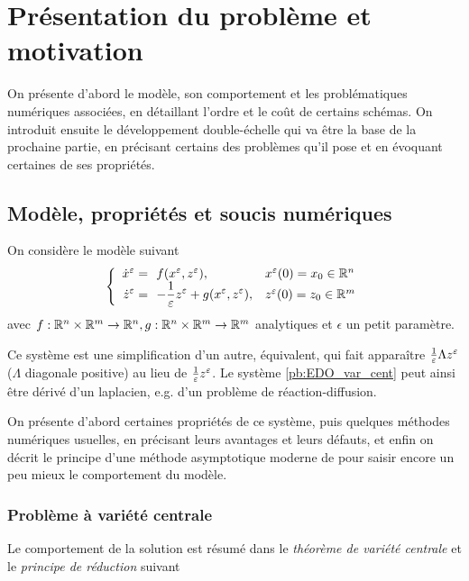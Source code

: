 
\chapter{Présentation du problème et motivation} 

On présente d'abord le modèle, son comportement et les problématiques numériques associées, en détaillant l'ordre et le coût de certains schémas. 
On introduit ensuite le développement double-échelle qui va être la base de la prochaine partie, en précisant certains des problèmes qu'il pose et en évoquant certaines de ses propriétés. 

\section{Modèle, propriétés et soucis numériques}

On considère le modèle suivant 
\begin{equation} \label{pb:EDO_var_cent} \left\{
\begin{array}{rll}
\dot x^{\varepsilon} =&\!\! f(x^{\varepsilon},z^{\varepsilon}) , &x^{\varepsilon}(0) = x_0\in\mathbb{R}^n \\ \displaystyle
\dot z^{\varepsilon} =&\!\! \displaystyle -\frac{1}{\varepsilon} z^{\varepsilon} + g(x^{\varepsilon},z^{\varepsilon}), &z^{\varepsilon}(0) = z_0\in\mathbb{R}^m
\end{array} \right.
\end{equation}
avec $f:\mathbb{R}^n\times\mathbb{R}^m \rightarrow \mathbb{R}^n,g:\mathbb{R}^n\times\mathbb{R}^m\rightarrow\mathbb{R}^m$ analytiques et $\epsilon$ un petit paramètre. 

Ce système est une simplification d'un autre, équivalent, qui fait apparaître $\frac{1}{\varepsilon} \Lambda z^{\varepsilon}$ ($\Lambda$ diagonale positive) au lieu de $\frac{1}{\varepsilon} z^{\varepsilon}$. 
Le système \eqref{pb:EDO_var_cent} peut ainsi être dérivé d'un laplacien, e.g. d'un problème de réaction-diffusion. 

On présente d'abord certaines propriétés de ce système, puis quelques méthodes numériques usuelles, en précisant leurs avantages et leurs défauts, et enfin on décrit le principe d'une méthode asymptotique moderne de \cite{castella2016formal} pour saisir encore un peu mieux le comportement du modèle. 


\subsection{Problème à variété centrale} 

Le comportement de la solution est résumé dans le \textit{théorème de variété centrale} et le \textit{principe de réduction}\cite{carr1982} suivant 

